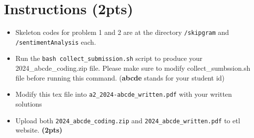 \documentclass{assignment format}
\begin{document}
\begin{center}

\end{center}
\def\showanswers{1}

\section{Instructions (2pts)}
\begin{itemize}
\item Skeleton codes for problem 1 and 2 are at the directory \texttt{/skipgram} and \texttt{/sentimentAnalysis} each. 
\item Run the \texttt{bash collect\_submission.sh} script to produce your 2024\_abcde\_coding.zip file. Please make sure to modify collect\_sumbssion.sh file before running this command. (\textbf{abcde} stands for your student id)
\item Modify this tex file into \texttt{a2\_2024-abcde\_written.pdf} with your written solutions
\item Upload both \texttt{2024\_abcde\_coding.zip} and \texttt{2024\_abcde\_written.pdf} to etl website. \textbf{(2pts)}\\
\end{itemize}



\end{document}
